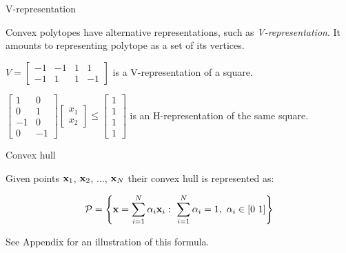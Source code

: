 \documentclass{beamer}
\begin{document}
\begin{frame}{V-representation}
\begin{flushleft}

Convex polytopes have alternative representations, such as \emph{V-representation}. It amounts to representing polytope as a set of its vertices.

\begin{example}
$V = \begin{bmatrix} -1 & -1 & 1 & 1 \\ -1 & 1 & 1 & -1 \end{bmatrix}$ is a V-representation of a square.
\end{example}

\begin{example}
$\begin{bmatrix} 1 & 0 \\ 0 & 1 \\ -1 & 0 \\ 0 & -1 \end{bmatrix}
\begin{bmatrix} x_1 \\ x_2 \end{bmatrix} \leq
\begin{bmatrix} 1 \\ 1 \\ 1 \\ 1 \end{bmatrix}$
is an H-representation of the same square.
\end{example}
 
\end{flushleft}
\end{frame}


\begin{frame}{Convex hull}
	\begin{flushleft}
		
		Given points $\mathbf{x}_1$, $\mathbf{x}_2$, ..., $\mathbf{x}_N$ their convex hull is represented as:
		
		\begin{equation}
			\mathcal{P} = \left \{  \mathbf{x} = \sum_{i=1}^{N} \alpha_i\mathbf{x}_i: \   \sum_{i=1}^{N} \alpha_i = 1, \  \alpha_i  \in [0 \ 1] \right \}
		\end{equation}
		
		See Appendix for an illustration of this formula.
		
	\end{flushleft}
\end{frame}
\end{document}
